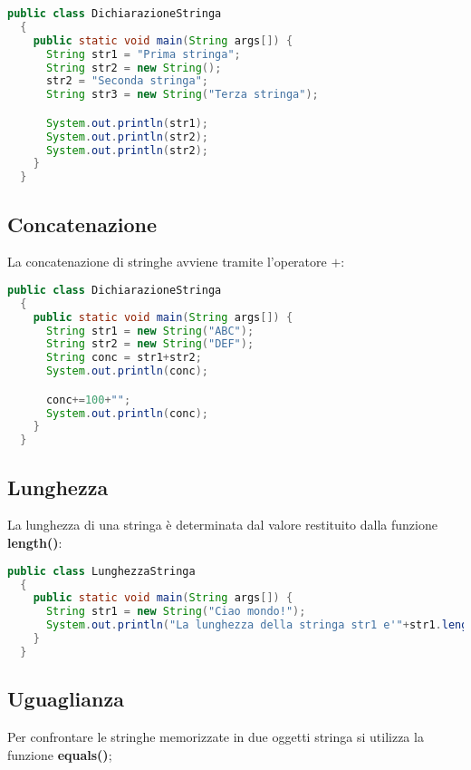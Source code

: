 \documentclass[a4paper]{extarticle}
\begin{document}
\vspace{1em}
\noindent
\begin{lstlisting}[language=Java, caption=Esempio dichiarazione stringa in Java]
  public class DichiarazioneStringa
  {
    public static void main(String args[]) {
      String str1 = "Prima stringa";
      String str2 = new String();
      str2 = "Seconda stringa";
      String str3 = new String("Terza stringa");

      System.out.println(str1);
      System.out.println(str2);
      System.out.println(str2);
    }
  }
\end{lstlisting}

\vspace{1em}
\subsection{Concatenazione}
La concatenazione di stringhe avviene tramite l'operatore $+$:

\vspace{1em}
\noindent
\begin{lstlisting}[language=Java, caption=Dichiarazione di una stringa in Java]
  public class DichiarazioneStringa
  {
    public static void main(String args[]) {
      String str1 = new String("ABC");
      String str2 = new String("DEF");
      String conc = str1+str2;
      System.out.println(conc);

      conc+=100+"";
      System.out.println(conc);
    }
  }
\end{lstlisting}

\vspace{1em}
\subsection{Lunghezza}
La lunghezza di una stringa è determinata dal valore restituito dalla funzione \textbf{length()}:

\vspace{1em}
\noindent
\begin{lstlisting}[language=Java, caption=Lunghezza di una stringa in Java]
  public class LunghezzaStringa
  {
    public static void main(String args[]) {
      String str1 = new String("Ciao mondo!");
      System.out.println("La lunghezza della stringa str1 e'"+str1.length);
    }
  }
\end{lstlisting}

\newpage
\subsection{Uguaglianza}
Per confrontare le stringhe memorizzate in due oggetti stringa si utilizza la funzione \textbf{equals()};
\end{document}
